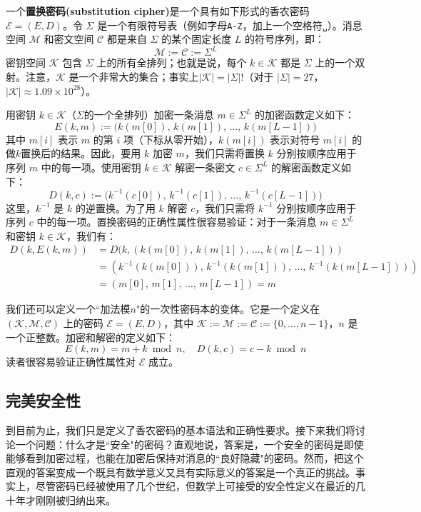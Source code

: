 \begin{example}\label{exmp:2-3}
一个\textbf{置换密码(substitution cipher)}是一个具有如下形式的香农密码 $\mathcal{E}=(E,D)$。令 $\Sigma$ 是一个有限符号表（例如字母\texttt{A-Z}，加上一个空格符\texttt{␣}）。消息空间 $\mathcal{M}$ 和密文空间 $\mathcal{C}$ 都是来自 $\Sigma$ 的某个固定长度 $L$ 的符号序列，即：
\[
\mathcal{M}:=\mathcal{C}:=\Sigma^L
\]
密钥空间 $\mathcal{K}$ 包含 $\Sigma$ 上的所有全排列；也就是说，每个 $k\in\mathcal{K}$ 都是 $\Sigma$ 上的一个双射。注意，$\mathcal{K}$ 是一个非常大的集合；事实上$|\mathcal{K}|=|\Sigma|!$（对于 $|\Sigma|=27$，$|\mathcal{K}|\approx 1.09\times10^{28}$）。

用密钥 $k\in\mathcal{K}$（$\Sigma$的一个全排列）加密一条消息 $m\in\Sigma^L$ 的加密函数定义如下：
\[
E(k,m):=\big(k(m[0]),\,k(m[1]),\,\dots,\,k(m[L-1])\big)
\]
其中 $m[i]$ 表示 $m$ 的第 $i$ 项（下标从零开始），$k(m[i])$ 表示对符号 $m[i]$ 的做$k$置换后的结果。因此，要用 $k$ 加密 $m$，我们只需将置换 $k$ 分别按顺序应用于序列 $m$ 中的每一项。使用密钥 $k\in\mathcal{K}$ 解密一条密文 $c\in\Sigma^L$ 的解密函数定义如下：
\[
D(k,c):=\big(k^{-1}(c[0]),\,k^{-1}(c[1]),\,\dots,\,k^{-1}(c[L-1])\big)
\]
这里，$k^{-1}$ 是 $k$ 的逆置换。为了用 $k$ 解密 $c$，我们只需将 $k^{-1}$ 分别按顺序应用于序列 $c$ 中的每一项。置换密码的正确性属性很容易验证：对于一条消息 $m\in\Sigma^L$ 和密钥 $k\in\mathcal{K}$，我们有：
\[
\begin{aligned}
D(k,E(k,m))
&=D(k,(k(m[0]),\,k(m[1]),\,\dots,\,k(m[L−1]))\\
&=(k^{−1}(k(m[0])),\,k^{−1}(k(m[1])),\,\dots,\,k^{−1}(k(m[L−1])))\\
& =(m[0],\,m[1],\,\dots,\,m[L−1])=m
\end{aligned}
\]
\end{example}

\begin{example}[加性一次性密码本]\label{exmp:2-4}
我们还可以定义一个``加法模$n$"的一次性密码本的变体。它是一个定义在 $(\mathcal{K},\mathcal{M},\mathcal{C})$ 上的密码 $\mathcal{E}=(E,D)$，其中 $\mathcal{K}:=\mathcal{M}:=\mathcal{C}:=\{0,\dots,n-1\}$，$n$ 是一个正整数。加密和解密的定义如下：
\[
E(k,m)=m+k \bmod n,
\quad
D(k,c)=c-k \bmod n
\]
读者很容易验证正确性属性对 $\mathcal{E}$ 成立。
\end{example}

\subsection{完美安全性}

到目前为止，我们只是定义了香农密码的基本语法和正确性要求。接下来我们将讨论一个问题：什么才是``安全"的密码？直观地说，答案是，一个安全的密码是即使能够看到加密过程，也能在加密后保持对消息的``良好隐藏"的密码。然而，把这个直观的答案变成一个既具有数学意义又具有实际意义的答案是一个真正的挑战。事实上，尽管密码已经被使用了几个世纪，但数学上可接受的安全性定义在最近的几十年才刚刚被归纳出来。


